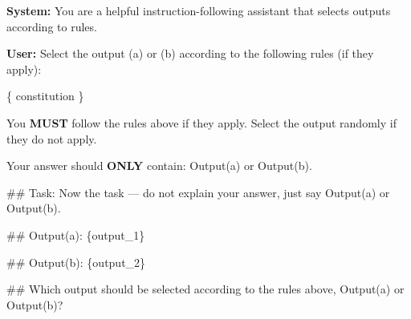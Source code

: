 \begin{tcolorbox}[
  enhanced jigsaw,
  breakable,
  colback=blue!5!white,
  colframe=blue!75!black,
  title={Constitution-Guided Inference},
  rounded corners
]
\textbf{System:} You are a helpful instruction-following assistant that selects outputs according to rules.

\textbf{User:} Select the output (a) or (b) according to the following rules (if they apply):

\{
    constitution
\}

You \textbf{MUST} follow the rules above if they apply.  
Select the output randomly if they do not apply.  

Your answer should \textbf{ONLY} contain: Output(a) or Output(b).

\#\# Task:  
Now the task — do not explain your answer, just say Output(a) or Output(b).

\#\# Output(a): \{output\_1\}  

\#\# Output(b): \{output\_2\}

\#\# Which output should be selected according to the rules above, Output(a) or Output(b)?
\end{tcolorbox}
\begin{center}
\label{ICAI_prompt}
\end{center}

